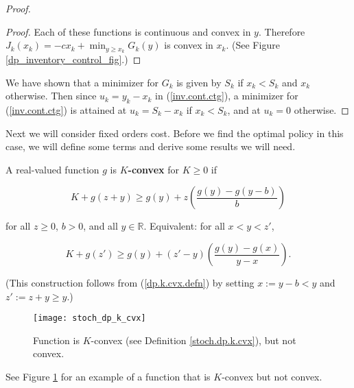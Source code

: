 \begin{proof}
\begin{proof}
Each of these functions is continuous and convex in \(y\). Therefore \(J_k(x_k) = -c x_k + \min_{y \geq x_k} G_k(y)\) is convex in \(x_k\). (See Figure \ref{dp_inventory_control_fig}.)

\end{proof}


We have shown that a minimizer for \(G_k\) is given by \(S_k\) if \(x_k < S_k\) and \(x_k\) otherwise. Then since \(u_k = y_k - x_k\) in (\ref{inv.cont.ctg}), a minimizer for (\ref{inv.cont.ctg}) is attained at \(u_k = S_k - x_k\) if \(x_k < S_k\), and at \(u_k = 0\) otherwise. 

\end{proof}

Next we will consider fixed orders cost. Before we find the optimal policy in this case, we will define some terms and derive some results we will need.

\begin{definition}\label{stoch.dp.k.cvx}

A real-valued function \(g\) is \(K\)\textbf{-convex} for \(K \geq 0\) if 

\begin{equation}\label{dp.k.cvx.defn}
K + g(z+y) \geq g(y) + z \left( \frac{ g(y) - g(y-b)}{b} \right)
\end{equation}

for all \(z \geq 0\), \(b >0\), and all \(y \in \mathbb{R}\). Equivalent: for all \(x < y < z'\), 

\begin{equation}\label{stoch.dp.k.cvx.2}
K + g(z') \geq g(y) + (z'-y) \left(  \frac{g(y) - g(x)}{y - x} \right).
\end{equation}

(This construction follows from (\ref{dp.k.cvx.defn}) by setting \(x := y-b < y\) and \(z' := z + y \geq y\).)

\begin{figure}[htbp]
\begin{center}
\texttt{[image: stoch\_dp\_k\_cvx]}
\caption{Function is \(K\)-convex (see Definition \ref{stoch.dp.k.cvx}), but not convex.}
\label{stoch_dp_k_cvx_fig}
\end{center}
\end{figure}



See Figure \ref{stoch_dp_k_cvx_fig} for an example of a function that is \(K\)-convex but not convex.

\end{definition}

